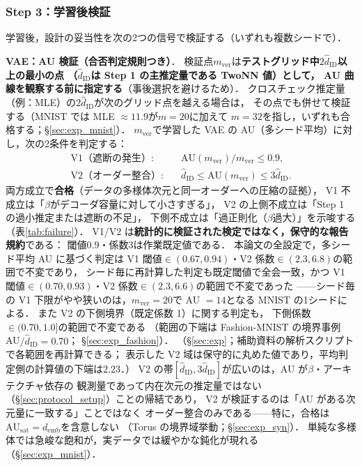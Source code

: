 \documentclass[11pt,a4paper]{jsarticle}
\newcommand{\hatdID}{\hat{d}_{\mathrm{ID}}}
\newcommand{\AUsat}{\mathrm{AU}_{\mathrm{sat}}}
\newcommand{\demb}{d_{\mathrm{emb}}}
\begin{document}
\subsubsection{Step 3：学習後検証}\label{sec:protocol_s3}

学習後，設計の妥当性を次の2つの信号で検証する（いずれも複数シードで）．

\textbf{VAE：AU 検証（合否判定規則つき）}．
検証点$m_{\mathrm{ver}}$は\textbf{テストグリッド中$2\hatdID$以上の最小の点
（$\hatdID$は Step 1 の主推定量である TwoNN 値）として，
AU 曲線を観察する前に指定する}（事後選択を避けるため）．
クロスチェック推定量（例：MLE）の$2\hatdID$が次のグリッド点を越える場合は，
その点でも併せて検証する（MNIST では MLE $\approx 11.9$が$m = 20$に加えて
$m = 32$を指し，いずれも合格する；§\ref{sec:exp_mnist}）．
$m_{\mathrm{ver}}$で学習した VAE の AU（多シード平均）に対し，次の2条件を判定する：
\begin{align}
  \text{V1（遮断の発生）}:&\quad \mathrm{AU}(m_{\mathrm{ver}}) / m_{\mathrm{ver}} \leq 0.9,
  \label{eq:rule_v1}\\
  \text{V2（オーダー整合）}:&\quad \hatdID \leq \mathrm{AU}(m_{\mathrm{ver}}) \leq 3\hatdID.
  \label{eq:rule_v2}
\end{align}
両方成立で\textbf{合格}（データの多様体次元と同一オーダーへの圧縮の証拠），
V1 不成立は「$\beta$がデコーダ容量に対して小さすぎる」，
V2 の上側不成立は「Step 1 の過小推定または遮断の不足」，
下側不成立は「過正則化（$\beta$過大）」を示唆する（表\ref{tab:failure}）．
V1/V2 は\textbf{統計的に検証された検定ではなく，保守的な報告規約}である：
閾値$0.9$・係数$3$は作業既定値である．
本論文の全設定で，多シード平均 AU に基づく判定は
V1 閾値$\in (0.67, 0.94)$・V2 係数$\in (2.3, 6.8)$の範囲で不変であり，
シード毎に再計算した判定も既定閾値で全会一致，かつ
V1 閾値$\in (0.70, 0.93)$・V2 係数$\in (2.3, 6.6)$の範囲で不変であった
——シード毎の V1 下限がやや狭いのは，$m_{\mathrm{ver}} = 20$で AU $= 14$となる
MNIST の1シードによる．
また V2 の下側境界（既定係数 1）に関する判定も，
下側係数$\in (0.70, 1.0]$の範囲で不変である
（範囲の下端は Fashion-MNIST の境界事例 AU$/\hatdID = 0.70$；
§\ref{sec:exp_fashion}）．
（§\ref{sec:exp}；補助資料の解析スクリプトで各範囲を再計算できる；
表示した V2 域は保守的に丸めた値であり，平均判定側の計算値の下端は$2.23$．）
V2 の帯$[\hatdID, 3\hatdID]$が広いのは，AU が$\beta$・アーキテクチャ依存の
観測量であって内在次元の推定量ではない（§\ref{sec:protocol_setup}）ことの帰結であり，
V2 が検証するのは「AU がある次元量に一致する」ことではなく
オーダー整合のみである——特に，合格は$\AUsat = \demb$を含意しない
（Torus の境界域挙動；§\ref{sec:exp_syn}）．
単純な多様体では急峻な飽和が，実データでは緩やかな鈍化が現れる
（§\ref{sec:exp_mnist}）．
\end{document}
